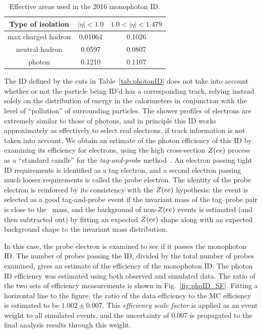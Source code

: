 \begin{table}
\centering
\begin{tabular}{ ccc }
\hline
Type of isolation & $|\eta| < 1.0$ & $1.0 < |\eta| < 1.479$ \\
\hline
max charged hadron & 0.01064 & 0.1026 \\
neutral hadron & 0.0597 & 0.0807 \\
photon & 0.1210 & 0.1107 \\
\hline
\end{tabular}
\caption{Effective areas used in the 2016 monophoton ID.}
\label{tab:effective_areas}
\end{table}

The ID defined by the cuts in Table~\ref{tab:photonID} does not take into account whether or not the particle being ID'd has a corresponding track, relying instead solely on the distribution
of energy in the calorimeters in conjunction with the level of ``pollution'' of surrounding particles. The shower profiles of electrons are extremely similar to those of photons, and in principle
this ID works approximately as effectively to select real electrons, if track information is not taken into account. We obtain an estimate of the photon efficiency of this ID by examining its
efficiency for electrons, using the high cross-section $Z(ee)$ process as a ``standard candle'' for the \textit{tag-and-probe} method~\cite{ref:CMS-PAS-EGM-07-001}. An electron passing
tight ID requirements is identified as a tag electron, and a second electron passing much looser requirements is called the probe electron. The identity of the probe electron is reinforced by
its consistency with the $Z(ee)$ hypothesis: the event is selected as a good tag-and-probe event if the invariant mass of the tag--probe pair is close to the \PZ\ mass, and the background
of non-$Z(ee)$ events is estimated (and then subtracted out) by fitting an expected $Z(ee)$ shape along with an expected background shape to the invariant mass distribution.

In this case, the probe electron is examined to see if it passes the monophoton ID. The number of probes passing the ID, divided by the total number of probes examined, gives an estimate of the efficiency
of the monophoton ID. The photon ID efficiency was estimated using both observed and simulated data. The ratio of the two sets of efficiency measurements is shown in Fig.~\ref{fig:phoID_SF}.
Fitting a horizontal line to the figure, the ratio of the data efficiency to the MC efficiency is estimated to be $1.002 \pm 0.007$. This \textit{efficiency scale factor} is applied as an event
weight to all simulated events, and the uncertainty of 0.007 is propagated to the final analysis results through this weight.

